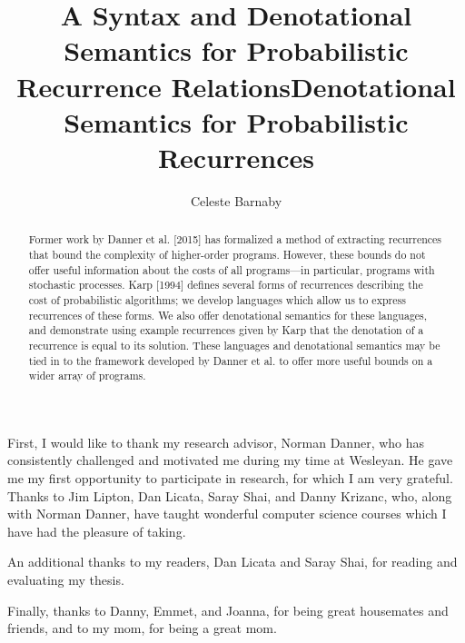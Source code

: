 \documentclass[12pt,final]{westhesis}
\title{A Syntax and Denotational Semantics for Probabilistic Recurrence Relations}
\theoremstyle{plain}
\theoremstyle{definition}
\begin{document}
\begin{abstract}
Former work by Danner et al. [2015] has formalized a method of extracting recurrences that bound the complexity
of higher-order programs. However, these bounds do not offer useful information about the costs of all programs---in particular,
programs with stochastic processes. Karp [1994] defines several forms of recurrences describing the cost of probabilistic
algorithms; we develop languages which allow us to express recurrences of these forms. We also offer denotational semantics for these languages, and demonstrate using example recurrences given by Karp that the denotation of a recurrence is equal to its solution. These languages and denotational semantics may be tied in to the framework developed by Danner et al. to offer
more useful bounds on a wider array of programs.
\end{abstract}

\begin{acknowledgements}

First, I would like to thank my research advisor, Norman Danner, who has consistently challenged and motivated me during my time at Wesleyan. He gave me my first opportunity to participate in research, for which I am very grateful. 
Thanks to Jim Lipton, Dan Licata, Saray Shai, and Danny Krizanc, who, along with Norman Danner, have
taught wonderful computer science courses which I have had the pleasure of taking. 

An additional thanks to my readers, Dan Licata and Saray Shai, for reading and evaluating my thesis. 

Finally, thanks to Danny, Emmet, and Joanna, for being great housemates and friends, and to my mom, for being a great mom. 

\end{acknowledgements}

\title{Denotational Semantics for Probabilistic Recurrences}
\author{Celeste Barnaby}

\maketitle

\frontmatter
\makeack
\makeabstract
\tableofcontents

\mainmatter









\end{document}
